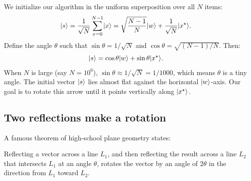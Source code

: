 We initialize our algorithm in the uniform superposition over all $N$ items:
\[
  \lvert s \rangle = \frac{1}{\sqrt{N}}\sum_{x=0}^{N-1}\lvert x \rangle
  = \sqrt{\frac{N-1}{N}}\lvert w \rangle + \frac{1}{\sqrt{N}}\lvert x^\star \rangle.
\]
Define the angle $\theta$ such that $\sin\theta = 1/\sqrt{N}$ and $\cos\theta = \sqrt{(N-1)/N}$. Then:
\[
  \lvert s \rangle = \cos\theta\lvert w \rangle + \sin\theta\lvert x^\star \rangle.
\]
When $N$ is large (say $N = 10^6$), $\sin\theta \approx 1/\sqrt{N} = 1/1000$, which
means $\theta$ is a tiny angle. The initial vector $\lvert s \rangle$ lies almost flat against the
horizontal $\lvert w \rangle$-axis. Our goal is to rotate this arrow until it points vertically
along $\lvert x^\star \rangle$.

\subsection{Two reflections make a rotation}

A famous theorem of high-school plane geometry states:
\begin{theorem}
Reflecting a vector across a line $L_1$, and then reflecting the result across a line
$L_2$ that intersects $L_1$ at an angle $\theta$, rotates the vector by an angle of
$2\theta$ in the direction from $L_1$ toward $L_2$.
\end{theorem}

